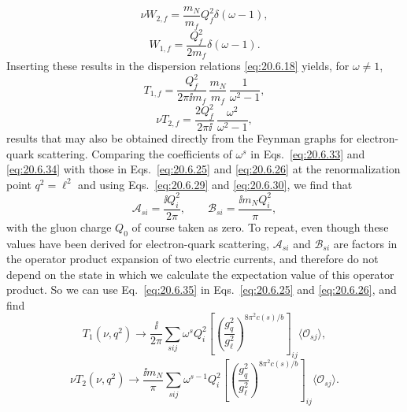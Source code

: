 \begin{equation}
\nu W_{2,f}
=\frac{m_N}{m_f}Q_f^2\delta(\omega-1),
\tag{20.6.31}\label{eq:20.6.31}
\end{equation}
\begin{equation}
W_{1,f}
=\frac{Q_f^2}{2m_f}\delta(\omega-1).
\tag{20.6.32}\label{eq:20.6.32}
\end{equation}
Inserting these results in the dispersion relations \eqref{eq:20.6.18} yields, for $\omega\ne1$,
\begin{equation}
T_{1,f}
=\frac{Q_f^2}{2\pi \ii m_f}\,
\frac{m_N}{m_f}\,
\frac{1}{\omega^2-1},
\tag{20.6.33}\label{eq:20.6.33}
\end{equation}
\begin{equation}
\nu T_{2,f}
=\frac{2Q_f^2}{2\pi \ii}\,
\frac{\omega^2}{\omega^2-1},
\tag{20.6.34}\label{eq:20.6.34}
\end{equation}
results that may also be obtained directly from the Feynman graphs for electron-quark scattering. Comparing the coefficients of $\omega^s$ in Eqs.~\eqref{eq:20.6.33} and \eqref{eq:20.6.34} with those in Eqs.~\eqref{eq:20.6.25} and \eqref{eq:20.6.26} at the renormalization point $q^2=\ell^2$ and using Eqs.~\eqref{eq:20.6.29} and \eqref{eq:20.6.30}, we find that
\begin{equation}
\mathcal A_{si}=\frac{\ii Q_i^2}{2\pi},
\qquad
\mathcal B_{si}=\frac{\ii m_NQ_i^2}{\pi},
\tag{20.6.35}\label{eq:20.6.35}
\end{equation}
with the gluon charge $Q_0$ of course taken as zero. To repeat, even though these values have been derived for electron-quark scattering, $\mathcal A_{si}$ and $\mathcal B_{si}$ are factors in the operator product expansion of two electric currents, and therefore do not depend on the state in which we calculate the expectation value of this operator product. So we can use Eq.~\eqref{eq:20.6.35} in Eqs.~\eqref{eq:20.6.25} and \eqref{eq:20.6.26}, and find
\begin{equation}
T_1(\nu,q^2)\longrightarrow
\frac{\ii}{2\pi}\sum_{sij}\omega^sQ_i^2
\left[
\left(\frac{g_q^2}{g_\ell^2}\right)^{8\pi^2c(s)/b}
\right]_{ij}
\langle\mathcal O_{sj}\rangle,
\tag{20.6.36}\label{eq:20.6.36}
\end{equation}
\begin{equation}
\nu T_2(\nu,q^2)\longrightarrow
\frac{\ii m_N}{\pi}\sum_{sij}\omega^{s-1}Q_i^2
\left[
\left(\frac{g_q^2}{g_\ell^2}\right)^{8\pi^2c(s)/b}
\right]_{ij}
\langle\mathcal O_{sj}\rangle.
\tag{20.6.37}\label{eq:20.6.37}
\end{equation}

